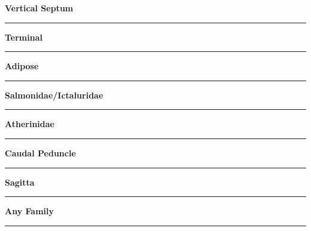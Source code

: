 \documentclass[11pt]{exam}
\newcommand*\Matching[1]{
\ifprintanswers
	\textbf{#1}
\else
	\rule{2.1in}{0.4pt}
\fi
}
\newlength\matchlena
\newlength\matchlenb
\newcommand\MatchQuestion[2]{%
	\setlength\matchlenb{\linewidth}
	\addtolength\matchlenb{-\matchlena}
	\parbox[t]{\matchlena}{\Matching{#1}}\enspace\parbox[t]{\matchlenb}{#2}}
\begin{document}
\begin{questions}
\begin{multicols}{2}
\question\MatchQuestion{Vertical Septum}{}
\vspace{2\baselineskip}

\question\MatchQuestion{Terminal}{}
\vspace{2\baselineskip}

\question\MatchQuestion{Adipose}{}
\vspace{2\baselineskip}

\question[\textsc{ec}]\MatchQuestion{Salmonidae/Ictaluridae}{}
\vspace{2\baselineskip}

\question\MatchQuestion{Atherinidae}{}
\vspace{2\baselineskip}

\question\MatchQuestion{Caudal Peduncle}{}
\vspace{2\baselineskip}

\question[\textsc{ec}]\MatchQuestion{Sagitta}{}
\vspace{2\baselineskip}

\question[\textsc{ec}]\MatchQuestion{Any Family}{}
\vspace{2\baselineskip}

\end{multicols}

\end{questions}
\end{document}
